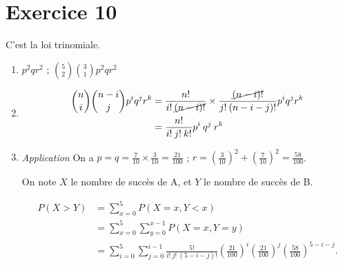 \part{Exercice 10}

C'est la loi trinomiale.

\begin{enumerate}
	\item $p^2 q r^2$ ; ${5 \choose 2}{3\choose 1} p^2 q r^2$
	\item
		\begin{align*}
			{n\choose i}{n-i\choose j} p^iq^jr^k &= \frac{n!}{i!\:\cancel{(n-i)!}} \times \frac{\cancel{(n-i)!}}{j!\:(n-i-j)!} p^i q^j r^k \\
				&= \frac{n!}{i!\:j!\:k!} p^i\:q^j\:r^k \\
		\end{align*}
	\item {\it Application}
		On a $p = q = \frac{7}{10} \times \frac{3}{10} = \frac{21}{100}$ ; $r = \left( \frac{3}{10} \right)^2 + \left( \frac{7}{10} \right)^2 = \frac{58}{100}$.

		On note $X$ le nombre de succès de A, et $Y$ le nombre de succès de B.

		\begin{align*}
			P(X > Y) &= \sum_{x = 0}^5 P(X = x,Y < x) \\
			&= \sum_{x = 0}^5 \sum_{y=0}^{x-1} P(X = x, Y = y) \\
			&= \sum_{i = 0}^5 \sum_{j=0}^{i-1} \frac{5!}{i!\:j!\:(5-i-j)!}\left( \frac{21}{100} \right)^{i} \left( \frac{21}{100} \right)^{j} \left( \frac{58}{100} \right)^{5-i-j}. \\
		\end{align*}
\end{enumerate}

